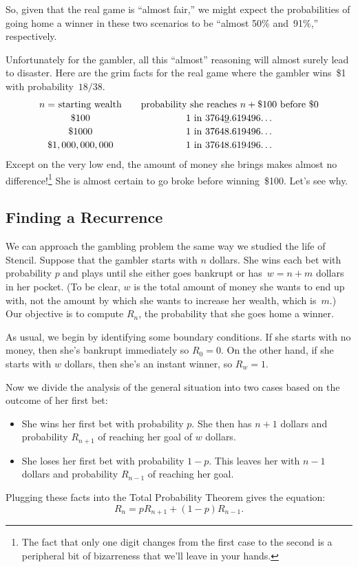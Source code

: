 So, given that the real game is ``almost fair,'' we might expect the
probabilities of going home a winner in these two scenarios to be
``almost 50\% and~91\%,'' respectively.

Unfortunately for the gambler, all this ``almost'' reasoning will
almost surely lead to disaster.  Here are the grim facts for the real
game where the gambler wins~\$1 with probability~$18/38$.
\[
\begin{array}{c@{\qquad}c}
\text{$n =$ starting wealth} &
\text{probability she reaches $n + \$100$ before \$0} \\[0.5ex]
\$100 & \text{1 in 3764\underline{9}.619496\ldots} \\[0.5ex]
\$1000 & \text{1 in 37648.619496\ldots} \\[0.5ex]
\$1,000,000,000 & \text{1 in 37648.619496\ldots}
\end{array}
\]
%
Except on the very low end, the amount of money she brings makes
almost no difference!\footnote{The fact that only one digit changes
  from the first case to the second is a peripheral bit of bizarreness
  that we'll leave in your hands.} She is almost certain to go broke
before winning~\$100.  Let's see why.

\subsection{Finding a Recurrence}

We can approach the gambling problem the same way we studied the life
of Stencil.  Suppose that the gambler starts with $n$ dollars.  She
wins each bet with probability $p$ and plays until she either goes
bankrupt or has~$w = n + m$ dollars in her pocket.  (To be clear, $w$
is the total amount of money she wants to end up with, not the amount
by which she wants to increase her wealth, which is~$m$.)  Our
objective is to compute $R_n$, the probability that she goes home a
winner.

As usual, we begin by identifying some boundary conditions.  If she
starts with no money, then she's bankrupt immediately so $R_0 = 0$.
On the other hand, if she starts with $w$ dollars, then she's an
instant winner, so $R_w = 1$.

Now we divide the analysis of the general situation into two cases
based on the outcome of her first bet:
%
\begin{itemize}

\item She wins her first bet with probability $p$.  She then has $n +
1$ dollars and probability $R_{n+1}$ of reaching her goal of $w$
dollars.

\item She loses her first bet with probability $1-p$.  This leaves her
with $n - 1$ dollars and probability $R_{n-1}$ of reaching her goal.

\end{itemize}
%
Plugging these facts into the Total Probability Theorem gives the
equation:
%
\begin{equation}\label{eqn:19P3}
    R_n = p R_{n+1} + (1 - p) R_{n-1}.
\end{equation}

